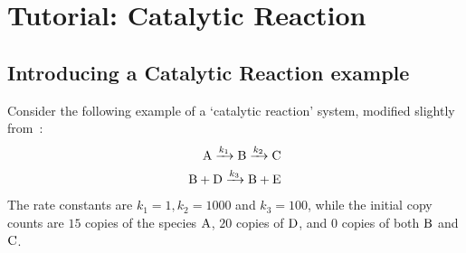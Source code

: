 \section{Tutorial: Catalytic Reaction}
\subsection{Introducing a Catalytic Reaction example}
Consider the following example of a `catalytic reaction' system, modified
slightly from~\cite{mastny2007two}:
\begin{align*}
 \textrm{{A}}  \xrightarrow{k_1}  \textrm{{B}}  \xrightarrow{k_2}  \textrm{{C}}  \\
 \textrm{{B}}  +  \textrm{{D}}  \xrightarrow{k_3}  \textrm{{B}}  +  \textrm{{E}} 
\end{align*}
The rate constants are $k_1 = 1, k_2 = 1000$ and $k_3 = 100$, while the initial
copy counts are $15$ copies of the species $ \textrm{{A}} $, $20$ copies of
$ \textrm{{D}} $, and $0$ copies of both $ \textrm{{B}} $ and $ \textrm{{C}} $.

